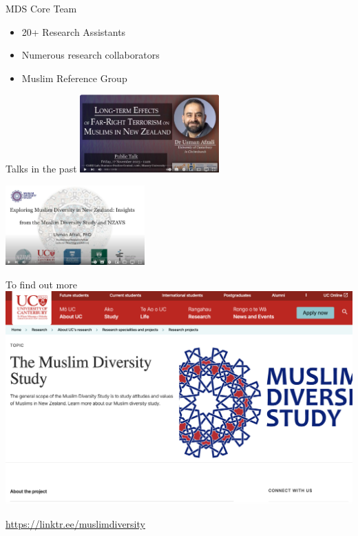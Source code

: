 \documentclass[
  ignorenonframetext,
  aspectratio=169,
]{beamer}
\providecommand{\tightlist}{%
  \setlength{\itemsep}{0pt}\setlength{\parskip}{0pt}}\usepackage{longtable,booktabs,array}
\begin{document}
\begin{frame}{MDS Core Team}
\begin{figure}
\end{figure}%
\end{frame}

\begin{frame}
\begin{itemize}
\tightlist
\item
  20+ Research Assistants
\item
  Numerous research collaborators
\item
  Muslim Reference Group
\end{itemize}
\end{frame}

\begin{frame}{Talks in the past}
\label{talks-in-the-past}
\includegraphics[width=0.4\textwidth,height=\textheight]{figs/care-lecture.png}

\includegraphics[width=0.4\textwidth,height=\textheight]{figs/uc-lecture.png}
\end{frame}

\begin{frame}{To find out more}
\label{to-find-out-more}
\includegraphics{figs/mds-uc-banner.png}

\url{https://linktr.ee/muslimdiversity}
\end{frame}
\end{document}
